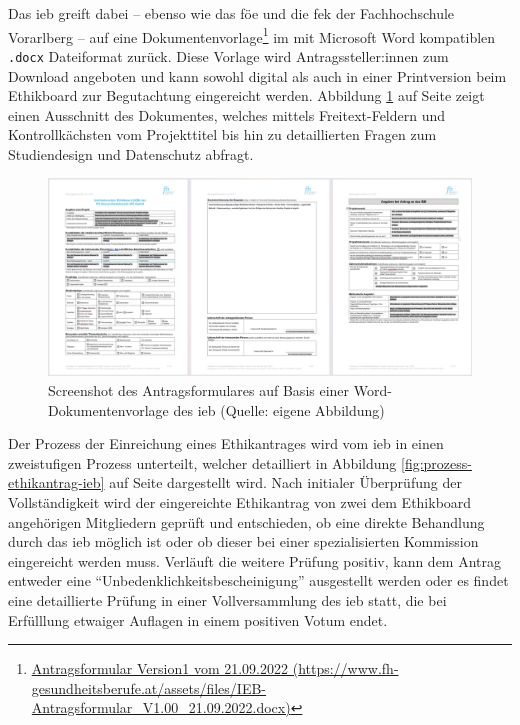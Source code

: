 \documentclass[a4paper,12pt,twoside]{scrreprt}
\begin{document}
Das \ac{ieb} greift dabei -- ebenso wie das \ac{föe} und die \ac{fek} der Fachhochschule Vorarlberg -- auf eine Dokumentenvorlage\footnote{\href{https://www.fh-gesundheitsberufe.at/assets/files/IEB-Antragsformular_V1.00_21.09.2022.docx}{Antragsformular Version1 vom 21.09.2022 (\url{https://www.fh-gesundheitsberufe.at/assets/files/IEB-Antragsformular_V1.00_21.09.2022.docx)}}} im mit Microsoft Word kompatiblen \texttt{.docx} Dateiformat zurück. Diese Vorlage wird Antragssteller:innen zum Download angeboten und kann sowohl digital als auch in einer Printversion beim Ethikboard zur Begutachtung eingereicht werden. \cite{fh_gesundheitsberufe_oo_gmbh_einreichung_2023} Abbildung \ref{fig:dokumentenvorlage-ieb} auf Seite \pageref{fig:dokumentenvorlage-ieb} zeigt einen Ausschnitt des Dokumentes, welches mittels Freitext-Feldern und Kontrollkächsten vom Projekttitel bis hin zu detaillierten Fragen zum Studiendesign und Datenschutz abfragt.

\begin{figure}[ht]
    \centering
    \includegraphics[scale=0.21]{thesis/images/Luidold_Word-Vorlage-IEB-FH-Gesundheitsberufe-OOE.png}
    \caption[Screenshot der Word-Dokumentenvorlage des Institutionellen Ethikboards der FH Gesundheitsberufe OÖ]{Screenshot des Antragsformulares auf Basis einer Word-Dokumentenvorlage des \ac{ieb} (Quelle: eigene Abbildung)}
    \label{fig:dokumentenvorlage-ieb}
\end{figure}

Der Prozess der Einreichung eines Ethikantrages wird vom \ac{ieb} in einen zweistufigen Prozess unterteilt, welcher detailliert in Abbildung \ref{fig:prozess-ethikantrag-ieb} auf Seite \pageref{fig:prozess-ethikantrag-ieb} dargestellt wird. Nach initialer Überprüfung der Vollständigkeit wird der eingereichte Ethikantrag von zwei dem Ethikboard angehörigen Mitgliedern geprüft und entschieden, ob eine direkte Behandlung durch das \ac{ieb} möglich ist oder ob dieser bei einer spezialisierten Kommission eingereicht werden muss. Verläuft die weitere Prüfung positiv, kann dem Antrag entweder eine \enquote{Unbedenklichkeitsbescheinigung} ausgestellt werden oder es findet eine detaillierte Prüfung in einer Vollversammlung des \ac{ieb} statt, die bei Erfülllung etwaiger Auflagen in einem positiven Votum endet. \cite{fh_gesundheitsberufe_oo_gmbh_einreichung_2023}
\end{document}
